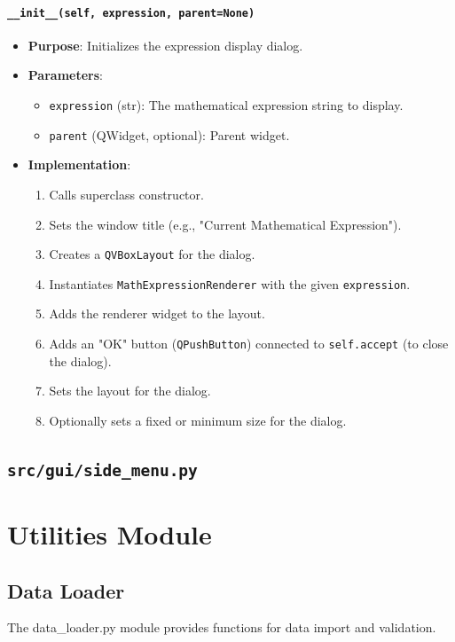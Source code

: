 \documentclass[12pt,a4paper]{report}
\begin{document}
\subsubsection{\texttt{\_\_init\_\_(self, expression, parent=None)}}
\begin{itemize}
    \item \textbf{Purpose}: Initializes the expression display dialog.
    \item \textbf{Parameters}:
        \begin{itemize}
            \item \texttt{expression} (str): The mathematical expression string to display.
            \item \texttt{parent} (QWidget, optional): Parent widget.
        \end{itemize}
    \item \textbf{Implementation}:
        \begin{enumerate}
            \item Calls superclass constructor.
            \item Sets the window title (e.g., "Current Mathematical Expression").
            \item Creates a \texttt{QVBoxLayout} for the dialog.
            \item Instantiates \texttt{MathExpressionRenderer} with the given \texttt{expression}.
            \item Adds the renderer widget to the layout.
            \item Adds an "OK" button (\texttt{QPushButton}) connected to \texttt{self.accept} (to close the dialog).
            \item Sets the layout for the dialog.
            \item Optionally sets a fixed or minimum size for the dialog.
        \end{enumerate}
\end{itemize}

\section{\texttt{src/gui/side\_menu.py}}

\chapter{Utilities Module}
\section{Data Loader}
The data\_loader.py module provides functions for data import and validation.
\end{document}
